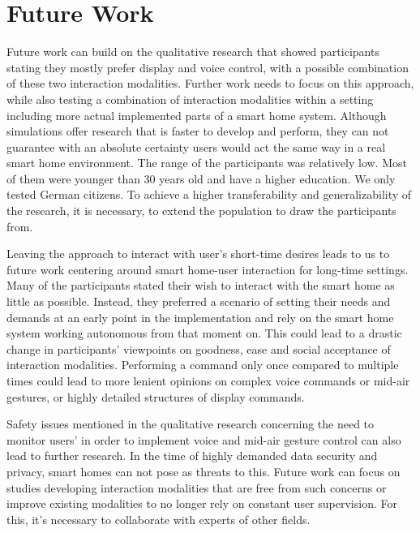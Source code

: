 \documentclass[sigchi]{acmart}
\begin{document}
	\section{Future Work}
	Future work can build on the qualitative research that showed participants stating they mostly prefer display and voice control, with a possible combination of these two interaction modalities. Further work needs to focus on this approach, while also testing a combination of interaction modalities within a setting including more actual implemented parts of a smart home system. Although simulations offer research that is faster to develop and perform, they can not guarantee with an absolute certainty users would act the same way in a real smart home environment. 
	The range of the participants was relatively low. Most of them were younger than 30 years old and have a higher education. We only tested German citizens. To achieve a higher transferability and generalizability of the research, it is necessary, to extend the population to draw the participants from. 
	
	Leaving the approach to interact with user's short-time desires leads to us to future work centering around smart home-user interaction for long-time settings. Many of the participants stated their wish to interact with the smart home as little as possible. Instead, they preferred a scenario of setting their needs and demands at an early point in the implementation and rely on the smart home system working autonomous from that moment on. This could lead to a drastic change in participants' viewpoints on goodness, ease and social acceptance of interaction modalities. Performing a command only once compared to multiple times could lead to more lenient opinions on complex voice commands or mid-air gestures, or highly detailed structures of display commands.
	
	Safety issues mentioned in the qualitative research concerning the need to monitor users' in order to implement voice and mid-air gesture control can also lead to further research. In the time of highly demanded data security and privacy, smart homes can not pose as threats to this. Future work can focus on studies developing interaction modalities that are free from such concerns or improve existing modalities to no longer rely on constant user supervision. For this, it's necessary to collaborate with experts of other fields.
	
\end{document}
